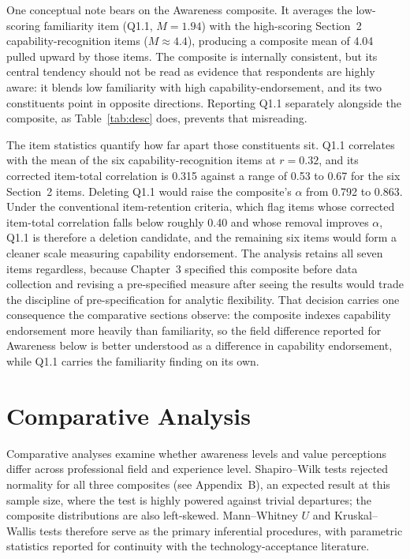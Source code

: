One conceptual note bears on the Awareness composite. It averages the low-scoring familiarity item (Q1.1, $M=1.94$) with the high-scoring Section~2 capability-recognition items ($M\approx4.4$), producing a composite mean of 4.04 pulled upward by those items. The composite is internally consistent, but its central tendency should not be read as evidence that respondents are highly aware: it blends low familiarity with high capability-endorsement, and its two constituents point in opposite directions. Reporting Q1.1 separately alongside the composite, as Table~\ref{tab:desc} does, prevents that misreading.

The item statistics quantify how far apart those constituents sit. Q1.1 correlates with the mean of the six capability-recognition items at $r=0.32$, and its corrected item-total correlation is 0.315 against a range of 0.53 to 0.67 for the six Section~2 items. Deleting Q1.1 would raise the composite's $\alpha$ from 0.792 to 0.863. Under the conventional item-retention criteria, which flag items whose corrected item-total correlation falls below roughly 0.40 and whose removal improves $\alpha$, Q1.1 is therefore a deletion candidate, and the remaining six items would form a cleaner scale measuring capability endorsement. The analysis retains all seven items regardless, because Chapter~3 specified this composite before data collection and revising a pre-specified measure after seeing the results would trade the discipline of pre-specification for analytic flexibility. That decision carries one consequence the comparative sections observe: the composite indexes capability endorsement more heavily than familiarity, so the field difference reported for Awareness below is better understood as a difference in capability endorsement, while Q1.1 carries the familiarity finding on its own.



\section{Comparative Analysis}

Comparative analyses examine whether awareness levels and value perceptions differ across professional field and experience level. Shapiro--Wilk tests rejected normality for all three composites (see Appendix~B), an expected result at this sample size, where the test is highly powered against trivial departures; the composite distributions are also left-skewed. Mann--Whitney $U$ and Kruskal--Wallis tests therefore serve as the primary inferential procedures, with parametric statistics reported for continuity with the technology-acceptance literature.


